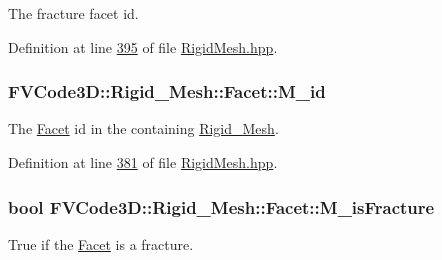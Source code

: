 The fracture facet id. 



Definition at line \hyperlink{RigidMesh_8hpp_source_l00395}{395} of file \hyperlink{RigidMesh_8hpp_source}{Rigid\+Mesh.\+hpp}.

\subsubsection[{\texorpdfstring{M\+\_\+id}{M_id}}]{ F\+V\+Code3\+D\+::\+Rigid\+\_\+\+Mesh\+::\+Facet\+::\+M\+\_\+id\hspace{0.3cm}{\ttfamily [protected]}}\hypertarget{classFVCode3D_1_1Rigid__Mesh_1_1Facet_a00456afaee76a9be2a9beb4180a76d15}{}\label{classFVCode3D_1_1Rigid__Mesh_1_1Facet_a00456afaee76a9be2a9beb4180a76d15}


The \hyperlink{classFVCode3D_1_1Rigid__Mesh_1_1Facet}{Facet} id in the containing \hyperlink{classFVCode3D_1_1Rigid__Mesh}{Rigid\+\_\+\+Mesh}. 



Definition at line \hyperlink{RigidMesh_8hpp_source_l00381}{381} of file \hyperlink{RigidMesh_8hpp_source}{Rigid\+Mesh.\+hpp}.

\subsubsection[{\texorpdfstring{M\+\_\+is\+Fracture}{M_isFracture}}]{\setlength{\rightskip}{0pt plus 5cm}bool F\+V\+Code3\+D\+::\+Rigid\+\_\+\+Mesh\+::\+Facet\+::\+M\+\_\+is\+Fracture\hspace{0.3cm}{\ttfamily [protected]}}\hypertarget{classFVCode3D_1_1Rigid__Mesh_1_1Facet_aa73335dc182e64f956d5628a1c00db83}{}\label{classFVCode3D_1_1Rigid__Mesh_1_1Facet_aa73335dc182e64f956d5628a1c00db83}


True if the \hyperlink{classFVCode3D_1_1Rigid__Mesh_1_1Facet}{Facet} is a fracture. 



